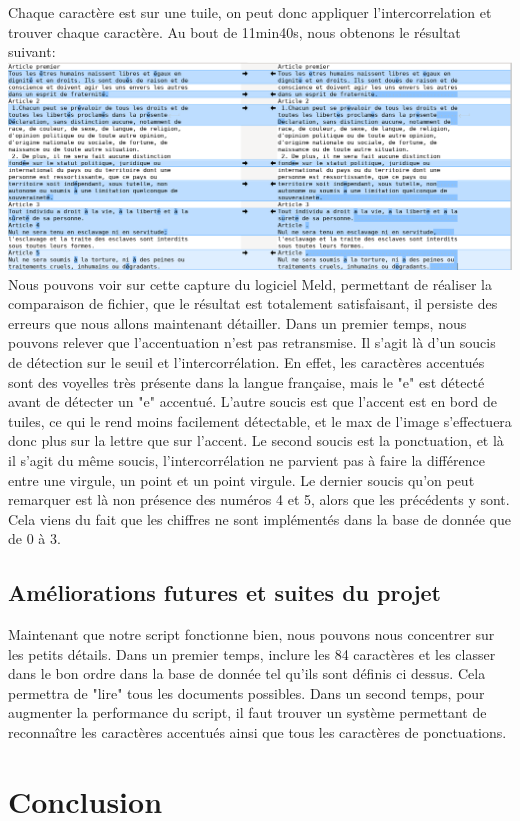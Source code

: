 \documentclass[a4paper,12pt,titlepage]{report}
\begin{document}
	Chaque caractère est sur une tuile, on peut donc appliquer l'intercorrelation et trouver chaque caractère.
	Au bout de 11min40s, nous obtenons le résultat suivant:
	\includegraphics[scale=0.25]{../illus/diffDUDH.png}
	Nous pouvons voir sur cette capture du logiciel Meld, permettant de réaliser la comparaison de fichier, que le résultat est totalement satisfaisant, il persiste des erreurs que nous allons maintenant détailler.
	Dans un premier temps, nous pouvons relever que l'accentuation n'est pas retransmise. Il s'agit là d'un soucis de détection sur le seuil et l'intercorrélation. En effet, les caractères accentués sont des voyelles très présente dans la langue française, mais le "e" est détecté avant de détecter un "e" accentué. L'autre soucis est que l'accent est en bord de tuiles, ce qui le rend moins facilement détectable, et le max de l'image s'effectuera donc plus sur la lettre que sur l'accent.
	Le second soucis est la ponctuation, et là il s'agit du même soucis, l'intercorrélation ne parvient pas à faire la différence entre une virgule, un point et un point virgule.
	Le dernier soucis qu'on peut remarquer est là non présence des numéros 4 et 5, alors que les précédents y sont. Cela viens du fait que les chiffres ne sont implémentés dans la base de donnée que de 0 à 3.
	\subsection{Améliorations futures et suites du projet}	
	Maintenant que notre script fonctionne bien, nous pouvons nous concentrer sur les petits détails. Dans un premier temps, inclure les 84 caractères et les classer dans le bon ordre dans la base de donnée tel qu'ils sont définis ci dessus. Cela permettra de "lire" tous les documents possibles. Dans un second temps, pour augmenter la performance du script, il faut trouver un système permettant de reconnaître les caractères accentués ainsi que tous les caractères de ponctuations.
	\section{Conclusion}
	
\end{document}
